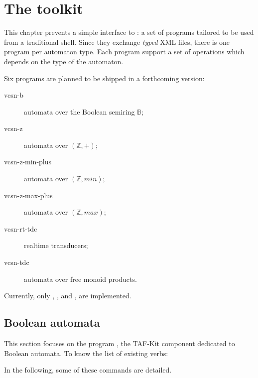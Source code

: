 %
%
\newcommand{\includegenerateddot}[1]{\texttt{[image: \#1]}}
\newcommand{\execcaption}[2]{}

\chapter{The \Vauc toolkit}

This chapter prevents a simple interface to \Vauc: a set of programs
tailored to be used from a traditional shell.  Since they exchange
\emph{typed} XML files, there is one program per automaton type.  Each
program support a set of operations which depends on the type of the
automaton.

Six programs are planned to be shipped in a forthcoming version:
\begin{description}
\item[vcsn-b] automata over the Boolean semiring $\mathbb{B}$;
\item[vcsn-z] automata over $(\mathbb{Z},+)$;
\item[vcsn-z-min-plus] automata over $(\mathbb{Z},min)$;
\item[vcsn-z-max-plus] automata over $(\mathbb{Z},max)$;
\item[vcsn-rt-tdc] realtime transducers;
\item[vcsn-tdc] automata over free monoid products.
\end{description}

Currently, only , , and
, are implemented.

\newpage

\section{Boolean automata}

This section focuses on the program , the
TAF-Kit component dedicated to Boolean automata.  To know the list of
existing verbs:

\execcaption{vcsn-b-commands}{vcsn-b --list-commands}

In the following, some of these commands are detailed.

